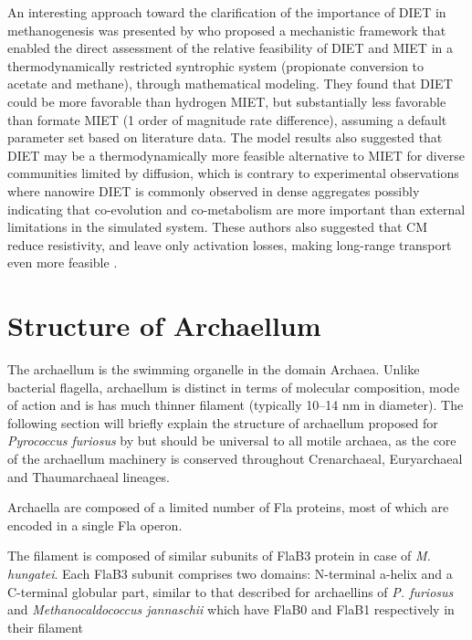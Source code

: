 \documentclass[fontsize=12pt,headsepline=true, bibliography=totocnumbered, twoside]{scrbook} %
\begin{document}
An interesting approach toward the clarification of the importance of \ac{DIET} in 
methanogenesis was presented by \citet{storck2016modelling} who proposed a 
mechanistic framework that enabled the direct assessment of the relative 
feasibility of \ac{DIET} and \ac{MIET} in a 
thermodynamically restricted syntrophic system (propionate conversion to acetate and methane), 
through mathematical modeling. They found that \ac{DIET} could be more favorable than hydrogen \ac{MIET},
 but substantially less favorable than formate \ac{MIET} (1 order of magnitude rate difference), 
 assuming a default parameter set based on literature data. The model results also suggested
  that DIET may be a thermodynamically more feasible alternative to \ac{MIET} for diverse communities 
  limited by diffusion, which is contrary to experimental observations where nanowire \ac{DIET} is 
  commonly observed in dense aggregates possibly indicating that co-evolution and 
  co-metabolism are more important than external limitations in the simulated system. 
  These authors also suggested that \ac{CM} reduce resistivity, and leave only activation losses, making long-range transport even more feasible \citep{martins2018methane}.









\section{Structure of Archaellum}

The archaellum is the swimming organelle in the domain Archaea. Unlike bacterial flagella, archaellum is distinct in terms of molecular composition, mode of action and is has much thinner filament (typically 10–14 nm in diameter)\citep{meshcheryakov2019high}. The following section will briefly explain the structure of archaellum proposed for \textit{Pyrococcus furiosus} by \citet{daum2017structure} 
but should be universal to all motile archaea, as the core of the archaellum machinery  is conserved throughout Crenarchaeal, Euryarchaeal and Thaumarchaeal lineages.







 Archaella are composed of a limited number of Fla proteins, most of which are encoded in a single Fla operon.\citep{meshcheryakov2019high} 

The filament is composed of similar subunits of FlaB3 protein in case of \textit{M. hungatei}. Each FlaB3 subunit comprises two domains: N-terminal a-helix and a C-terminal globular part, similar to that described for archaellins of \textit{P. furiosus} and \textit{Methanocaldococcus jannaschii} which have FlaB0 and FlaB1 respectively in their filament
\end{document}
